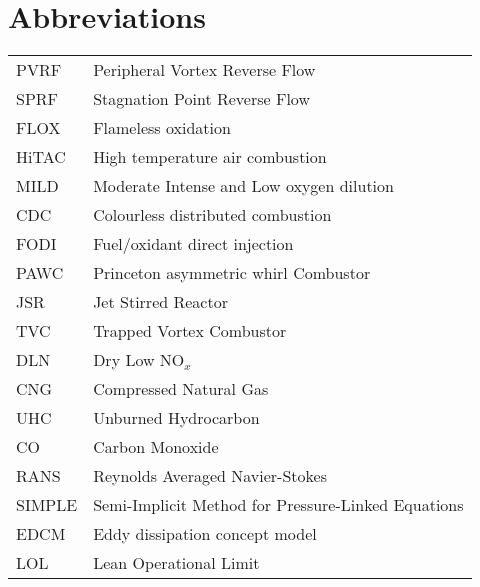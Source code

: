 \chapter*{Abbreviations}\label{LstAbb} 

\begin{flushleft}
\begin{longtable}{lp{11cm}}
	
PVRF & Peripheral Vortex Reverse Flow \\
SPRF & Stagnation Point Reverse Flow \\
FLOX & Flameless oxidation \\
HiTAC & High temperature air combustion \\
MILD & Moderate Intense and Low oxygen dilution \\
CDC & Colourless distributed combustion \\
FODI & Fuel/oxidant direct injection \\
PAWC & Princeton asymmetric whirl Combustor\\
JSR & Jet Stirred Reactor \\
TVC & Trapped Vortex Combustor \\
DLN &  Dry Low NO$_x$ \\
CNG & Compressed Natural Gas \\
UHC & Unburned Hydrocarbon \\
CO  & Carbon Monoxide \\
RANS & Reynolds Averaged Navier-Stokes \\
SIMPLE & Semi-Implicit Method for Pressure-Linked Equations \\
EDCM & Eddy dissipation concept model \\
LOL & Lean Operational Limit \\

\end{longtable}
\end{flushleft}
